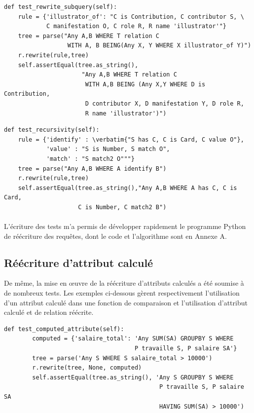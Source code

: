 \documentclass {report}
\begin{document}
\begin{lstlisting}[caption= Relation située dans la sous-requête \textsc{with being}]
def test_rewrite_subquery(self):
    rule = {'illustrator_of': "C is Contribution, C contributor S, \
            C manifestation O, C role R, R name 'illustrator'"}
    tree = parse("Any A,B WHERE T relation C 
                  WITH A, B BEING(Any X, Y WHERE X illustrator_of Y)")
    r.rewrite(rule,tree)
    self.assertEqual(tree.as_string(),
                      "Any A,B WHERE T relation C 
                       WITH A,B BEING (Any X,Y WHERE D is Contribution, 
                       D contributor X, D manifestation Y, D role R,
                       R name 'illustrator')")
\end{lstlisting}


\begin{lstlisting}[caption= Remplacement récursif]
 def test_recursivity(self):
    rule = {'identify' : \verbatim{"S has C, C is Card, C value O"},
            'value' : "S is Number, S match O",
            'match' : "S match2 O"""}
    tree = parse("Any A,B WHERE A identify B")
    r.rewrite(rule,tree)
    self.assertEqual(tree.as_string(),"Any A,B WHERE A has C, C is Card, 
                     C is Number, C match2 B")
\end{lstlisting}

\paragraph{}
L'écriture des tests m'a permis de développer rapidement le programme Python de réécriture des requêtes, dont le code et l'algorithme sont en Annexe A.

\subsection{Réécriture d'attribut calculé}
De même, la mise en œuvre de la réécriture d'attributs calculés a été soumise à de nombreux tests. Les exemples ci-dessous gèrent respectivement l'utilisation d'un attribut calculé dans une fonction de comparaison et l'utilisation d'attribut calculé et de relation réécrite.

\renewcommand{\lstlistingname}{Test}
\begin{lstlisting}[caption= Attribut calculé et fonction de comparaison]
def test_computed_attribute(self):
        computed = {'salaire_total': 'Any SUM(SA) GROUPBY S WHERE
                                     P travaille S, P salaire SA'}
        tree = parse('Any S WHERE S salaire_total > 10000')
        r.rewrite(tree, None, computed)
        self.assertEqual(tree.as_string(), 'Any S GROUPBY S WHERE
                                            P travaille S, P salaire SA
                                            HAVING SUM(SA) > 10000')
\end{lstlisting}
\end{document}
